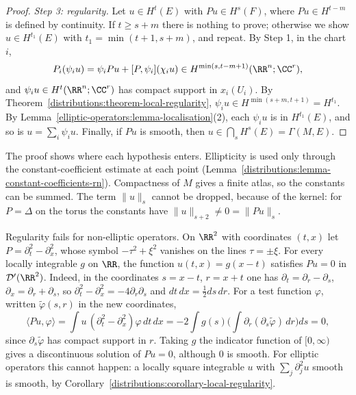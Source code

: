 \begin{proof}
\emph{Step 3: regularity.} Let $u \in H^t(E)$ with $Pu \in H^s(F)$, where $Pu \in H^{t-m}$ is defined by continuity. If $t \geq s + m$ there is nothing to prove; otherwise we show $u \in H^{t_1}(E)$ with
$t_1 = \min(t + 1, s + m)$, and repeat. By Step 1, in the chart $i$,
\[
P_i(\psi_iu) = \psi_iPu + [P, \psi_i](\chi_iu) \in H^{\min(s, t - m + 1)}(\RR^n; \CC^r),
\]
and $\psi_iu \in H^t(\RR^n; \CC^r)$ has compact support in $x_i(U_i)$. By Theorem~\ref{distributions:theorem-local-regularity}, $\psi_iu \in H^{\min(s+m, t+1)} = H^{t_1}$. By Lemma~\ref{elliptic-operators:lemma-localisation}(2),
each $\psi_iu$ is in $H^{t_1}(E)$, and so is $u = \sum_i\psi_iu$. Finally, if $Pu$ is smooth, then $u \in \bigcap_sH^s(E) = \Gamma(M, E)$.
\end{proof}

The proof shows where each hypothesis enters. Ellipticity is used only through the constant-coefficient estimate at each point (Lemma~\ref{distributions:lemma-constant-coefficients-rn}). Compactness of $M$ gives a finite atlas, so the
constants can be summed. The term $\|u\|_s$ cannot be dropped, because of the kernel: for $P = \Delta$ on the torus the constants have $\|u\|_{s+2} \neq 0 = \|Pu\|_s$.

\begin{counterexample}\label{elliptic-operators:counterexample-wave}
Regularity fails for non-elliptic operators. On $\RR^2$ with coordinates $(t, x)$ let $P = \partial_t^2 - \partial_x^2$, whose symbol $-\tau^2 + \xi^2$ vanishes on the lines $\tau = \pm\xi$. For every locally integrable $g$ on $\RR$,
the function $u(t, x) = g(x - t)$ satisfies $Pu = 0$ in $\mathcal{D}'(\RR^2)$. Indeed, in the coordinates $s = x - t$, $r = x + t$ one has $\partial_t = \partial_r - \partial_s$, $\partial_x = \partial_r + \partial_s$, so
$\partial_t^2 - \partial_x^2 = -4\partial_r\partial_s$ and $dt\,dx = \frac12ds\,dr$. For a test function $\varphi$, written $\tilde\varphi(s, r)$ in the new coordinates,
\[
\langle Pu, \varphi\rangle = \int u\,(\partial_t^2 - \partial_x^2)\varphi\,dt\,dx = -2\int g(s)\Big(\int\partial_r(\partial_s\tilde\varphi)\,dr\Big)ds = 0,
\]
since $\partial_s\tilde\varphi$ has compact support in $r$. Taking $g$ the indicator function of $[0, \infty)$ gives a discontinuous solution of $Pu = 0$, although $0$ is smooth. For elliptic operators this cannot happen: a
locally square integrable $u$ with $\sum_j\partial_j^2u$ smooth is smooth, by Corollary~\ref{distributions:corollary-local-regularity}.
\end{counterexample}

